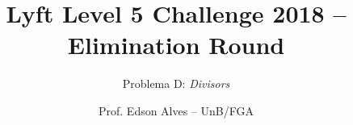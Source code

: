 \title{Lyft Level 5 Challenge 2018 -- Elimination Round}
\subtitle{Problema D: \it Divisors}
\author{Prof. Edson Alves -- UnB/FGA}
\date{}
